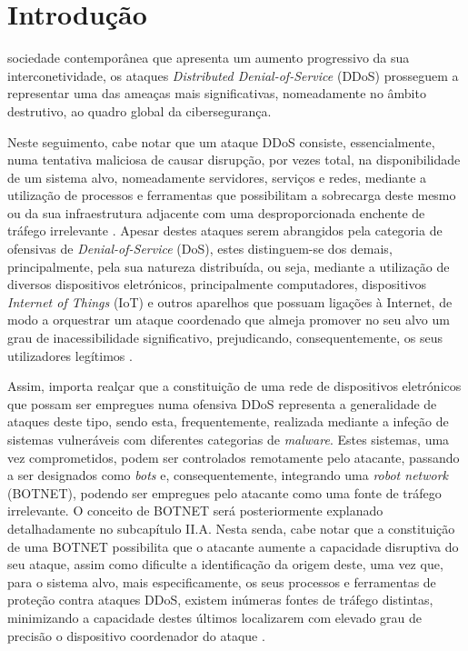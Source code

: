 \section{Introdução}
 sociedade contemporânea que apresenta um aumento progressivo da sua interconetividade, os ataques \textit{Distributed Denial-of-Service} (DDoS) prosseguem a representar uma das ameaças mais significativas, nomeadamente no âmbito destrutivo, ao quadro global da cibersegurança.

Neste seguimento, cabe notar que um ataque DDoS consiste, essencialmente, numa tentativa maliciosa
de causar disrupção, por vezes total, na disponibilidade de um sistema alvo, nomeadamente servidores, serviços e redes, mediante a utilização de processos e ferramentas que possibilitam a sobrecarga deste mesmo ou da sua infraestrutura adjacente com uma desproporcionada enchente de tráfego irrelevante \cite{cloudflare_what_is_ddos,ibm_what_is_ddos}. Apesar destes ataques serem abrangidos pela categoria de ofensivas de \textit{Denial-of-Service} (DoS), estes distinguem-se dos demais, principalmente, pela sua natureza distribuída, ou seja, mediante a utilização de diversos dispositivos eletrónicos, principalmente computadores, dispositivos \textit{Internet of Things} (IoT) e outros aparelhos que possuam ligações à Internet, de modo a orquestrar um ataque coordenado que almeja promover no seu alvo um grau de inacessibilidade significativo, prejudicando, consequentemente, os seus utilizadores legítimos \cite{zenamor_differences_dos_and_ddos}.

Assim, importa realçar que a constituição de uma rede de dispositivos eletrónicos que possam ser empregues numa ofensiva DDoS representa a generalidade de ataques deste tipo, sendo esta, frequentemente, realizada mediante a infeção de sistemas vulneráveis com diferentes categorias de \textit{malware}. Estes sistemas, uma vez comprometidos, podem ser controlados remotamente pelo atacante, passando a ser designados como \textit{bots} e, consequentemente, integrando uma \textit{robot network} (BOTNET), podendo ser empregues pelo atacante como uma fonte de tráfego irrelevante. O conceito de BOTNET será posteriormente explanado detalhadamente no subcapítulo II.A. Nesta senda, cabe notar que a constituição de uma BOTNET possibilita que o atacante aumente a capacidade disruptiva do seu ataque, assim como dificulte a identificação da origem deste, uma vez que, para o sistema alvo, mais especificamente, os seus processos e ferramentas de proteção contra ataques DDoS, existem inúmeras fontes de tráfego distintas, minimizando a capacidade destes últimos localizarem com elevado grau de precisão o dispositivo coordenador do ataque \cite{cloudflare_what_is_ddos}.

